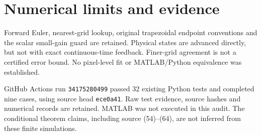 \documentclass[11pt]{article}
\begin{document}
\section{Numerical limits and evidence}
Forward Euler, nearest-grid lookup, original trapezoidal endpoint conventions and the scalar small-gain guard are retained. Physical states are advanced directly, but not with exact continuous-time feedback. Finer-grid agreement is not a certified error bound. No pixel-level fit or MATLAB/Python equivalence was established.

GitHub Actions run \texttt{34175280499} passed 32 existing Python tests and completed nine cases, using source head \texttt{ece0a41}. Raw test evidence, source hashes and numerical records are retained. MATLAB was not executed in this audit. The conditional theorem claims, including source (54)--(64), are not inferred from these finite simulations.
\end{document}

